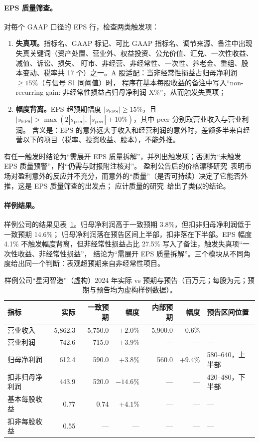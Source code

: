 \paragraph{EPS 质量筛查。}
对每个 GAAP 口径的 EPS 行，检查两类触发项：
\begin{enumerate}
\item \textbf{失真项。}指标名、GAAP 标记、可比 GAAP 指标名、调节来源、备注中出现失真关键词（资产处置、营业外、权益投资、公允价值、汇兑、一次性收益、减值、诉讼、损失、
      盯市、非经营、非经常性、一次性、养老金、重组、股本变动、税率共 17 个）之一。A 股适配：当非经常性损益占归母净利润 $\ge15\%$（与信号 S1 同阈值）时，
      程序在基本每股收益的备注中写入“non-recurring gain: 非经常性损益占归母净利润 X\%”，从而触发失真项；
\item \textbf{幅度背离。}EPS 超预期幅度 $|s_{\text{EPS}}|\ge15\%$，且 $|s_{\text{EPS}}|>\max(2|s_{\text{peer}}|,\ |s_{\text{peer}}|+10\%)$，其中 peer 分别取营业收入与营业利润。
      含义是：EPS 的意外远大于收入和经营利润的意外时，差额多半来自经营以下的项目（税率、投资收益、股本），不能外推。
\end{enumerate}
有任一触发时结论为“需展开 EPS 质量拆解”，并列出触发项；否则为“未触发 EPS 质量预警”，附“仍需与财报附注核对”。
盈利公告后的价格漂移研究~\citep{bernard1989pead}表明市场对盈利意外的反应并不充分，而意外的“质量”（是否可持续）决定了它能否外推，这是 EPS 质量筛查的出发点；
应计质量的研究~\citep{dechow2002quality}给出了类似的结论。

\paragraph{样例结果。}
样例公司的结果见表~\ref{tab:an-sample-earnings}。归母净利润高于一致预期 3.8\%，但扣非归母净利润低于一致预期 14.6\%；
归母净利润落在预告区间上半部，扣非落在下半部。EPS 幅度 4.1\% 不触发幅度背离，但非经常性损益占比 27.5\% 写入了备注，触发失真项“一次性收益、非经常性损益”，
结论为“需展开 EPS 质量拆解”。三个模块从不同角度给出同一个判断：表观超预期来自非经常性项目。

\begin{table}[t]
\centering
\caption{样例公司“星河智造”（虚构）2024 年实际 vs 预期与预告（百万元；每股为元；预期与预告均为虚构样例数据）。}
\label{tab:an-sample-earnings}
\small
\begin{tabular}{lrrrrrl}
\toprule
指标 & 实际 & 一致预期 & 幅度 & 内部预期 & 幅度 & 预告区间位置 \\
\midrule
营业收入 & 5,862.3 & 5,750.0 & $+2.0\%$ & 5,900.0 & $-0.6\%$ & — \\
营业利润 & 742.6 & 715.0 & $+3.9\%$ & — & — & — \\
归母净利润 & 612.4 & 590.0 & $+3.8\%$ & 560.0 & $+9.4\%$ & 580--640，上半部 \\
扣非归母净利润 & 443.9 & 520.0 & $-14.6\%$ & — & — & 420--480，下半部 \\
基本每股收益 & 0.77 & 0.74 & $+4.1\%$ & — & — & — \\
扣非每股收益 & 0.55 & — & — & — & — & — \\
\bottomrule
\end{tabular}
\end{table}

